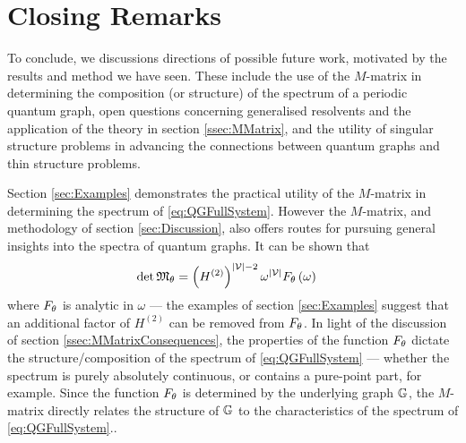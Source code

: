 \section{Closing Remarks} \label{sec:Conclusion}
To conclude, we discussions directions of possible future work, motivated by the results and method we have seen.
These include the use of the $M$-matrix in determining the composition (or structure) of the spectrum of a periodic quantum graph, open questions concerning generalised resolvents and the application of the theory in section \ref{ssec:MMatrix}, and the utility of singular structure problems in advancing the connections between quantum graphs and thin structure problems.

Section \ref{sec:Examples} demonstrates the practical utility of the $M$-matrix in determining the spectrum of \eqref{eq:QGFullSystem}.
However the $M$-matrix, and methodology of section \ref{sec:Discussion}, also offers routes for pursuing general insights into the spectra of quantum graphs.
It can be shown that 
\begin{align*}
	\det\mathfrak{M}_{\theta} &= \left(  H^{(2)}  \right)^{\left\lvert \mathcal{V} \right\rvert-2}\omega^{\left\lvert \mathcal{V} \right\rvert} F_{\theta}\left( \omega \right)
\end{align*}
where $F_{\theta}$ is analytic in $\omega$ --- the examples of section \ref{sec:Examples} suggest that an additional factor of $H^{(2)}$ can be removed from $F_{\theta}$.
In light of the discussion of section \ref{ssec:MMatrixConsequences}, the properties of the function $F_{\theta}$ dictate the structure/composition of the spectrum of \eqref{eq:QGFullSystem} --- whether the spectrum is purely absolutely continuous, or contains a pure-point part, for example.
Since the function $F_{\theta}$ is determined by the underlying graph $\mathbb{G}$, the $M$-matrix directly relates the structure of $\mathbb{G}$ to the characteristics of the spectrum of \eqref{eq:QGFullSystem}..

